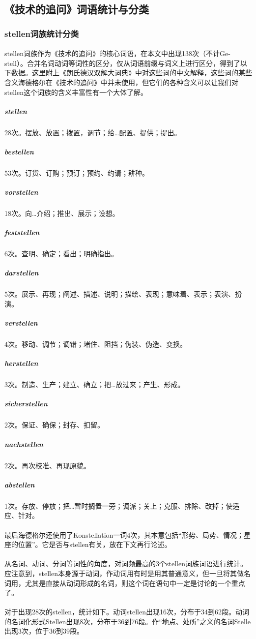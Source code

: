 \documentclass{article}
\begin{document}
	\subsection{《技术的追问》词语统计与分类}
		\subsubsection{stellen词族统计分类}
			\paragraph{}
			stellen词族作为《技术的追问》的核心词语，在本文中出现138次（不计Ge-stell）。合并名词动词等词性的区分，仅从词语前缀与词义上进行区分，得到了以下数据。这里附上《朗氏德汉双解大词典》中对这些词的中文解释，这些词的某些含义海德格尔在《技术的追问》中并未使用，但它们的各种含义可以让我们对stellen这个词族的含义丰富性有一个大体了解。
			\subparagraph{stellen}
			28次。摆放、放置；拨置，调节；给…配置、提供；提出。
			\subparagraph{bestellen}
			53次。订货、订购；预订；预约、约请；耕种。
			\subparagraph{vorstellen}
			18次。向…介绍；推出、展示；设想。
			\subparagraph{feststellen}
			6次。查明、确定；看出；明确指出。
			\subparagraph{darstellen}
			5次。展示、再现；阐述、描述、说明；描绘、表现；意味着、表示；表演、扮演。
			\subparagraph{verstellen}
			4次。移动、调节；调错；堵住、阻挡；伪装、伪造、变换。
			\subparagraph{herstellen}
			3次。制造、生产；建立、确立；把…放过来；产生、形成。
			\subparagraph{sicherstellen}
			2次。保证、确保；封存、扣留。
			\subparagraph{nachstellen}
			2次。再次校准、再现原貌。
			\subparagraph{abstellen}
			1次。存放、停放；把…暂时搁置一旁；调派；关上；克服、排除、改掉；使适应、针对。
			\paragraph{}			
			最后海德格尔还使用了Konstellation一词4次，其本意包括“形势、局势、情况；星座的位置”。它是否与stellen有关，放在下文再行论述。
			\paragraph{}	
			从名词、动词、分词等词性的角度，对词频最高的3个stellen词族词语进行统计。应注意到，stellen本身源于动词，作动词用有时是用其普通意义，但一旦将其做名词用，尤其是直接从动词形成的名词，则这个词在语句中一定是讨论的一个重点了。
			\paragraph{}	
对于出现28次的stellen，统计如下。动词stellen出现16次，分布于34到62段。动词的名词化形式Stellen出现8次，分布于36到76段。作“地点、处所”之义的名词Stelle出现3次，位于36到39段。
\end{document}
